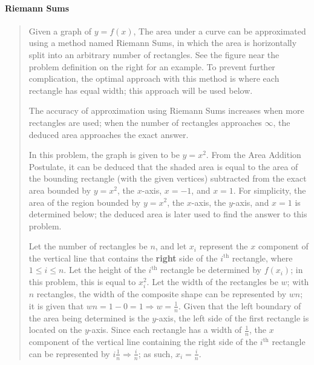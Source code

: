\documentclass[letterpaper,12pt,twoside]{report}
\begin{document}
	\paragraph{Riemann Sums}
	\begin{quotation}
		Given a graph of $y=f(x)$, The area under a curve can be approximated using a method named Riemann Sums, in which the area is horizontally split into an arbitrary number of rectangles. See the figure near the problem definition on the right for an example. To prevent further complication, the optimal approach with this method is where each rectangle has equal width; this approach will be used below.
		
		The accuracy of approximation using Riemann Sums increases when more rectangles are used; when the number of rectangles approaches $\infty$, the deduced area approaches the exact answer.
		
		In this problem, the graph is given to be $y=x^2$. From the Area Addition Postulate, it can be deduced that the shaded area is equal to the area of the bounding rectangle (with the given vertices) subtracted from the exact area bounded by $y=x^2$, the $x$-axis, $x=-1$, and $x=1$. For simplicity, the area of the region bounded by $y=x^2$, the $x$-axis, the $y$-axis, and $x=1$ is determined below; the deduced area is later used to find the answer to this problem.
		
		Let the number of rectangles be $n$, and let $x_i$ represent the $x$ component of the vertical line that contains the \textbf{right} side of the $i^\text{th}$ rectangle, where $1\leq i\leq n$. Let the height of the $i^\text{th}$ rectangle be determined by $f(x_i)$; in this problem, this is equal to $x_i^2$. Let the width of the rectangles be $w$; with $n$ rectangles, the width of the composite shape can be represented by $wn$; it is given that $wn=1-0=1 \Rightarrow w=\frac{1}{n}$. Given that the left boundary of the area being determined is the $y$-axis, the left side of the first rectangle is located on the $y$-axis. Since each rectangle has a width of $\frac{1}{n}$, the $x$ component of the vertical line containing the right side of the $i^\text{th}$ rectangle can be represented by $i\frac{1}{n} \Rightarrow \frac{i}{n}$; as such, $x_i=\frac{i}{n}$.
		

\end{quotation}
\end{document}

